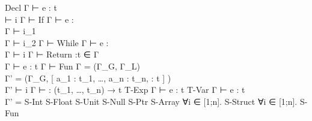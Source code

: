 {    {Decl}{ 
              { Γ ⊢ e : t
             \\  ⊢ i
              }
              { Γ ⊢  }
          }
    {If}{ 
            { Γ ⊢ e : \tInt \\
              Γ ⊢ i_1 \\
              Γ ⊢ i_2
            }
            { Γ ⊢  }
        }
    {While}{ 
               { Γ ⊢ e : \tInt \\
                 Γ ⊢ i
               }
               { Γ ⊢  }
           }
    {Return}{ 
                { \vRet:t ∈ Γ
               \\ Γ ⊢ e : t
                }
                { Γ ⊢  }
            }
    {Fun}{ 
             { Γ  = (Γ_G, Γ_L)
            \\ Γ' = (Γ_G,
                     [ a_1 : t_1,
                       …,
                       a_n : t_n,
                       \vRet : t
                     ]
                    )
            \\ Γ' ⊢ i
             }
             { Γ ⊢ 
                    : (t_1, …, t_n) → t
             }
         }
    {T-Exp}{ 
                { Γ ⊢ e : t }
                {  }
            }
    {T-Var}{ 
                { Γ ⊢ e : t
               \\ Γ' = 
                }
                {  }
            }
    {S-Int}{ 
               { }
               {}
           }
    {S-Float}{ 
                 { }
                 {}
    }
    {S-Unit}{ 
                { }
                {}
    }
    {S-Null}{ 
                { }
                {}
    }
    {S-Ptr}{ 
               {}
               {}
    }
    {S-Array}{ 
                 { ∀i ∈ [1;n]. }
                 {  }
    }
    {S-Struct}{ 
                  { ∀i ∈ [1;n].  }
                  { 
                                        {  }
                  }
    }
    {S-Fun}{ 
               { }
}}
